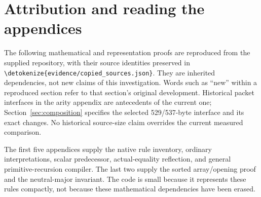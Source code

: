 \documentclass[11pt,letterpaper]{article}
\theoremstyle{definition}\newtheorem{definition}[theorem]{Definition}
\theoremstyle{remark}\newtheorem{remark}[theorem]{Remark}
\newcommand{\file}[1]{\expandafter\nolinkurl\expandafter{\detokenize{#1}}}
\begin{document}
\clearpage
\appendix
\section*{Attribution and reading the appendices}
The following mathematical and representation proofs are reproduced from
the supplied repository, with their source identities preserved in
\file{evidence/copied_sources.json}. They are inherited dependencies, not
new claims of this investigation. Words such as ``new'' within a reproduced
section refer to that section's original development. Historical packet
interfaces in the arity appendix are antecedents of the current one;
Section~\ref{sec:composition} specifies the selected 529/537-byte interface
and its exact changes. No historical source-size claim overrides the
current measured comparison.

The first five appendices supply the native rule inventory, ordinary
interpretations, scalar predecessor, actual-equality reflection, and
general primitive-recursion compiler. The last two supply the sorted
array/opening proof and the neutral-major invariant. The code is small
because it represents these rules compactly, not because these
mathematical dependencies have been erased.








\end{document}
